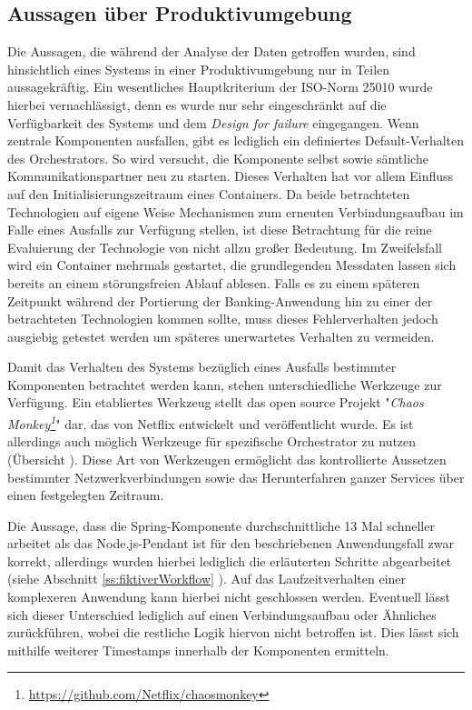 \subsection{Aussagen über Produktivumgebung}
Die Aussagen, die während der Analyse der Daten getroffen wurden, sind hinsichtlich eines Systems in einer Produktivumgebung nur in Teilen aussagekräftig. Ein wesentliches Hauptkriterium der ISO-Norm 25010 wurde hierbei vernachlässigt, denn es wurde nur sehr eingeschränkt auf die Verfügbarkeit des Systems und dem \emph{Design for failure} eingegangen. Wenn zentrale Komponenten ausfallen, gibt es lediglich ein definiertes Default-Verhalten des Orchestrators. So wird versucht, die Komponente selbst sowie sämtliche Kommunikationspartner neu zu starten. Dieses Verhalten hat vor allem Einfluss auf den Initialisierungszeitraum eines Containers. Da beide betrachteten Technologien auf eigene Weise Mechanismen zum erneuten Verbindungsaufbau im Falle eines Ausfalls zur Verfügung stellen, ist diese Betrachtung für die reine Evaluierung der Technologie von nicht allzu großer Bedeutung. Im Zweifelsfall wird ein Container mehrmals gestartet, die grundlegenden Messdaten lassen sich bereits an einem störungsfreien Ablauf ablesen. Falls es zu einem späteren Zeitpunkt während der Portierung der Banking-Anwendung hin zu einer der betrachteten Technologien kommen sollte, muss dieses Fehlerverhalten jedoch ausgiebig getestet werden um späteres unerwartetes Verhalten zu vermeiden. 

Damit das Verhalten des Systems bezüglich eines Ausfalls bestimmter Komponenten betrachtet werden kann, stehen unterschiedliche Werkzeuge zur Verfügung. Ein etabliertes Werkzeug stellt das open source Projekt "\emph{Chaos Monkey\footnote{\url{https://github.com/Netflix/chaosmonkey}}}" dar, das von Netflix entwickelt und veröffentlicht wurde. Es ist allerdings auch möglich Werkzeuge für spezifische Orchestrator zu nutzen (Übersicht \cite[Seite~369]{continuous-delivery}). Diese Art von Werkzeugen ermöglicht das kontrollierte Aussetzen bestimmter Netzwerkverbindungen sowie das Herunterfahren ganzer Services über einen festgelegten Zeitraum. 

Die Aussage, dass die Spring-Komponente durchschnittliche 13 Mal schneller arbeitet als das Node.js-Pendant ist für den beschriebenen Anwendungsfall zwar korrekt, allerdings wurden hierbei lediglich die erläuterten Schritte abgearbeitet (siehe Abschnitt \ref{ss:fiktiverWorkflow} ). Auf das Laufzeitverhalten einer komplexeren Anwendung kann hierbei nicht geschlossen werden. Eventuell lässt sich dieser Unterschied lediglich auf einen Verbindungsaufbau oder Ähnliches zurückführen, wobei die restliche Logik hiervon nicht betroffen ist. Dies lässt sich mithilfe weiterer Timestamps innerhalb der Komponenten ermitteln.



